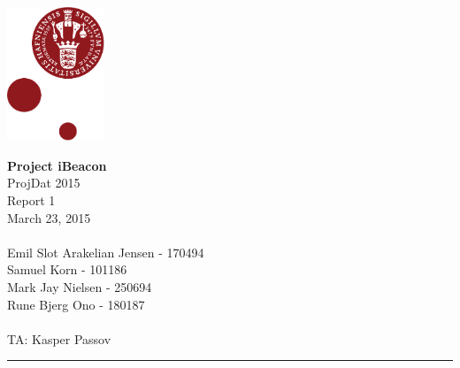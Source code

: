 \documentclass[12pt]{article}
\begin{document}
\begin{minipage}[b]{1.0\linewidth} 
\includegraphics[height=40mm]{KULogo}

\vspace*{-30ex}
\begin{center}
    {\Large \bf Project iBeacon} \vspace*{1ex} \\
    {\large ProjDat 2015} \vspace*{1ex} \\
    {\large Report 1} \vspace*{1ex} \\
    {\large March 23, 2015} \vspace*{1ex} \\
    \ \\
    
    {\large Emil Slot Arakelian Jensen - 170494} \vspace*{1ex}\\
	{\large Samuel Korn - 101186} \vspace*{1ex}\\
	{\large Mark Jay Nielsen - 250694} \vspace*{1ex}\\
	{\large Rune Bjerg Ono - 180187} \vspace*{1ex}\\
	\ \\
	
	{\large TA: Kasper Passov} \vspace*{1ex} \\
\end{center}

\vspace*{-3pt}
{\color{KU-red}\hrule}
\end{minipage}










\newpage

\tableofcontents
\end{document}
